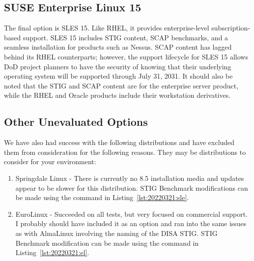 \subsection{SUSE Enterprise Linux 15}

The final option is SLES 15. Like RHEL, it provides enterprise-level subscription-based support. SLES 15 includes STIG content, SCAP benchmarks, and a seamless installation for products such as Nessus. SCAP content has lagged behind its RHEL counterparts; however, the support lifecycle for SLES 15 allows DoD project planners to have the security of knowing that their underlying operating system will be supported through July 31, 2031. It should also be noted that the STIG and SCAP content are for the enterprise server product, while the RHEL and Oracle products include their workstation derivatives.

\subsection{Other Unevaluated Options}

We have also had success with the following distributions and have excluded them from consideration for the following reasons. They may be distributions to consider for your environment:
\begin{enumerate}
	\item Springdale Linux - There is currently no 8.5 installation media and updates appear to be slower for this distribution. STIG Benchmark modifications can be made using the command in Listing~\ref{lst:20220321:sle}.
	\item EuroLinux - Succeeded on all tests, but very focused on commercial support. I probably should have included it as an option and ran into the same issues as with AlmaLinux involving the naming of the DISA STIG. STIG Benchmark modification can be made using the command in Listing~\ref{lst:20220321:el}.
\end{enumerate}


